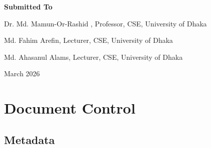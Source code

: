 \documentclass[12pt,a4paper]{article}
\begin{document}
\begin{titlepage}
\begin{center}
{  }
  \vspace{1em}
  \textbf{\large\color{Gold}Submitted To}\par
  \vspace{0.5em}
  {\color{white}Dr. Md. Mamun-Or-Rashid
, Professor,
CSE, University of Dhaka\par}
  {\color{white}Md. Fahim Arefin, Lecturer,
CSE, University of Dhaka\par}
  {\color{white}Md. Ahasanul Alams, Lecturer,
CSE, University of Dhaka\par}
  \vspace{0.5em}
  {\color{white!70}\small March 2026\par}
  \vfill
\end{center}
\end{titlepage}
\newpage


\tableofcontents
\newpage

\section{Document Control}

\subsection{Metadata}
\end{document}
